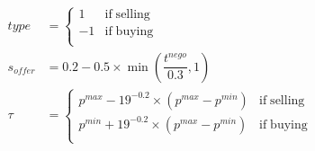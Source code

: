 \documentclass[uplatex, 10pt, a4j]{jsarticle}
\begin{document}
\begin{equation*}
    \begin{split}
        type&=\left\{\begin{array}{ll}
            1  & \mathrm{if \; selling} \\
            -1 & \mathrm{if \; buying}  \\
        \end{array}\right. \\
        s_{offer} &= 0.2-0.5 \times \min{\left(\dfrac{t^{nego}}{0.3}, 1\right)} \\
        \tau &= \left\{\begin{array}{ll}
            p^{max} - 19^{-0.2} \times \left(p^{max} - p^{min}\right) & \mathrm{if \; selling} \\
            p^{min} + 19^{-0.2} \times \left(p^{max} - p^{min}\right) & \mathrm{if \; buying}  \\
        \end{array}\right. \\
    \end{split}
\end{equation*}
\end{document}
